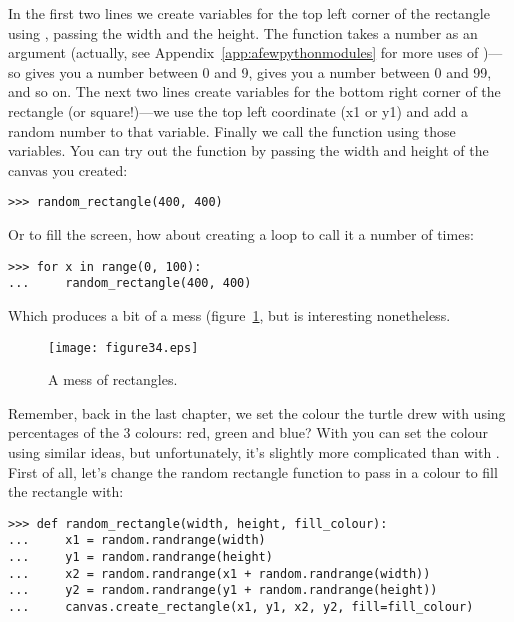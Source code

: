 In the first two lines we create variables for the top left corner of the rectangle using , passing the width and the height.  The  function takes a number as an argument (actually, see Appendix~\ref{app:afewpythonmodules} for more uses of )---so  gives you a number between 0 and 9,  gives you a number between 0 and 99, and so on. The next two lines create variables for the bottom right corner of the rectangle (or square!)---we use the top left coordinate (x1 or y1) and add a random number to that variable. Finally we call the  function using those variables. You can try out the  function by passing the width and height of the canvas you created:

\begin{listing}
\begin{verbatim}
>>> random_rectangle(400, 400)
\end{verbatim}
\end{listing}

\noindent
Or to fill the screen, how about creating a loop to call it a number of times:

\begin{listing}
\begin{verbatim}
>>> for x in range(0, 100):
...     random_rectangle(400, 400)
\end{verbatim}
\end{listing}

\noindent
Which produces a bit of a mess (figure~\ref{fig34}, but is interesting nonetheless.

\begin{figure}
\begin{center}
\texttt{[image: figure34.eps]}
\end{center}
\caption{A mess of rectangles.}\label{fig34}
\end{figure}

Remember, back in the last chapter, we set the colour the turtle drew with using percentages of the 3 colours: red, green and blue? With  you can set the colour using similar ideas, but unfortunately, it's slightly more complicated than with .  First of all, let's change the random rectangle function to pass in a colour to fill the rectangle with:

\begin{listing}
\begin{verbatim}
>>> def random_rectangle(width, height, fill_colour):
...     x1 = random.randrange(width)
...     y1 = random.randrange(height)
...     x2 = random.randrange(x1 + random.randrange(width))
...     y2 = random.randrange(y1 + random.randrange(height))
...     canvas.create_rectangle(x1, y1, x2, y2, fill=fill_colour)
\end{verbatim}
\end{listing}

